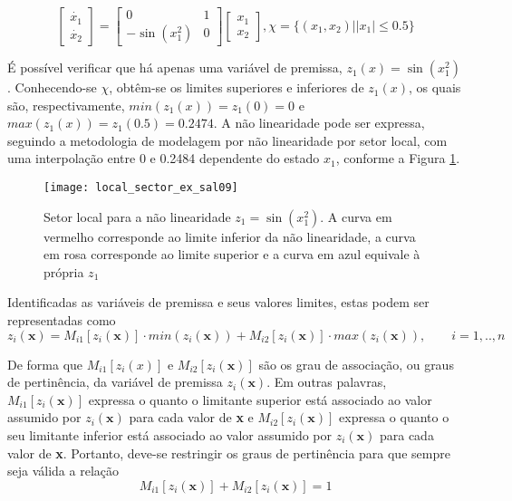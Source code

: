 \begin{example}
\begin{equation}\label{eq:ex_sal09}
 \begin{bmatrix}\dot{x_1}\\ \dot{x_2} \end{bmatrix} = \begin{bmatrix}0&1 \\-\sin(x_1^2)&0\end{bmatrix}\begin{bmatrix}x_1 \\x_2\end{bmatrix}, \chi = \{(x_1, x_2) | |x_1| \leq 0.5\}
\end{equation}\label{ex:sal09}
\end{example}

\'{E} possível verificar que há apenas uma variável de premissa, $z_1(x) = \sin(x_1^2)$. Conhecendo-se $\chi$, obtêm-se os limites superiores e inferiores de $z_1(x)$, os quais são, respectivamente, $min(z_1(x)) = z_1(0) = 0$ e $max(z_1(x)) = z_1(0.5) = 0.2474$. A não linearidade pode ser expressa, seguindo a metodologia de modelagem por não linearidade por setor local, com uma interpolação entre 0 e 0.2484 dependente do estado $x_1$, conforme a Figura \ref{fig:setor_local_ex_sal09}.
\begin{figure}[htbp]
	\centering
	\texttt{[image: local\_sector\_ex\_sal09]}
	\caption{Setor local para a não linearidade $z_1 = \sin(x_1^2)$. A curva em vermelho corresponde ao limite inferior da não linearidade, a curva em rosa corresponde ao limite superior e a curva em azul equivale à própria  $z_1$}
	 \label{fig:setor_local_ex_sal09}
\end{figure}

Identificadas as variáveis de premissa e seus valores limites, estas podem ser representadas como \cite{booktw:2003}
\begin{equation}\label{eq:var_premissas_por_grau_pert}
z_i(\textbf{x}) = M_{i1}[z_i(\textbf{x})] \cdot min(z_i(\textbf{x})) + M_{i2}[z_i(\textbf{x})] \cdot max(z_i(\textbf{x})),	\qquad i = 1, .., n
\end{equation}

De forma que $M_{i1}[z_i(x)]$ e $M_{i2}[z_i(\textbf{x})]$ são os grau de associação, ou graus de pertinência, da variável de premissa $z_i(\textbf{x})$. Em outras palavras, $M_{i1}[z_i(\textbf{x})]$ expressa o quanto o limitante superior está associado ao valor assumido por $z_i(\textbf{x})$ para cada valor de \textbf{x} e $M_{i2}[z_i(\textbf{x})]$ expressa o quanto o seu limitante inferior está associado ao valor assumido por $z_i(\textbf{x})$ para cada valor de \textbf{x}. Portanto, deve-se restringir os graus de pertinência para que  sempre seja válida a relação \cite{booktw:2003}
\begin{equation}\label{eq:grau_pert_igual_1}
M_{i1}[z_i(\textbf{x})] + M_{i2}[z_i(\textbf{x})] = 1
\end{equation}

